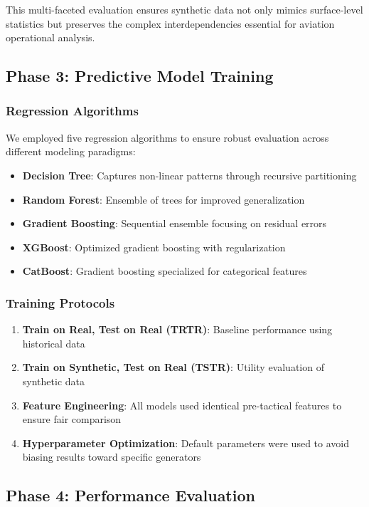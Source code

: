 \documentclass[conference]{IEEEtran}
\begin{document}
This multi-faceted evaluation ensures synthetic data not only mimics surface-level statistics but preserves the complex interdependencies essential for aviation operational analysis.


\subsection{Phase 3: Predictive Model Training}

\subsubsection{Regression Algorithms}
We employed five regression algorithms to ensure robust evaluation across different modeling paradigms:
\begin{itemize}
    \item \textbf{Decision Tree}: Captures non-linear patterns through recursive partitioning
    \item \textbf{Random Forest}: Ensemble of trees for improved generalization
    \item \textbf{Gradient Boosting}: Sequential ensemble focusing on residual errors
    \item \textbf{XGBoost}: Optimized gradient boosting with regularization
    \item \textbf{CatBoost}: Gradient boosting specialized for categorical features
\end{itemize}

\subsubsection{Training Protocols}
\begin{enumerate}
    \item \textbf{Train on Real, Test on Real (TRTR)}: Baseline performance using historical data
    \item \textbf{Train on Synthetic, Test on Real (TSTR)}: Utility evaluation of synthetic data
    \item \textbf{Feature Engineering}: All models used identical pre-tactical features to ensure fair comparison
    \item \textbf{Hyperparameter Optimization}: Default parameters were used to avoid biasing results toward specific generators
\end{enumerate}



\subsection{Phase 4: Performance Evaluation}
\end{document}
